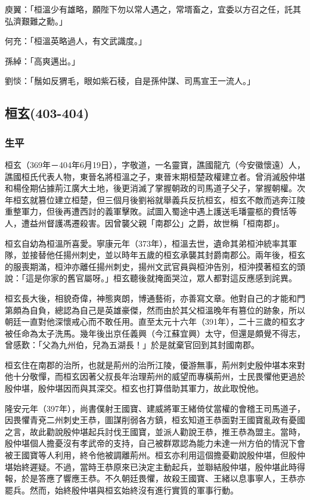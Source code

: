庾翼：「桓溫少有雄略，願陛下勿以常人遇之，常壻畜之，宜委以方召之任，託其弘濟艱難之勳。」

何充：「桓溫英略過人，有文武識度。」

孫綽：「高爽邁出。」

劉惔：「鬚如反猬毛，眼如紫石稜，自是孫仲謀、司馬宣王一流人。」

\subsection{桓玄\tiny(403-404)}

\subsubsection{生平}

桓玄（369年－404年6月19日），字敬道，一名靈寶，譙國龍亢（今安徽懷遠）人，譙國桓氏代表人物，東晉名將桓溫之子，東晉末期桓楚政權建立者。曾消滅殷仲堪和楊佺期佔據荊江廣大土地，後更消滅了掌握朝政的司馬道子父子，掌握朝權。次年桓玄就篡位建立桓楚，但三個月後劉裕就舉義兵反抗桓玄，桓玄不敵而逃奔江陵重整軍力，但後再遭西討的義軍擊敗。試圖入蜀途中遇上護送毛璠靈柩的費恬等人，遭益州督護馮遷殺害。因曾襲父親「南郡公」之爵，故世稱「桓南郡」。

桓玄自幼為桓溫所喜愛。寧康元年（373年），桓溫去世，遺命其弟桓沖統率其軍隊，並接替他任揚州刺史，並以時年五歲的桓玄承襲其封爵南郡公。兩年後，桓玄的服喪期滿，桓沖亦離任揚州刺史，揚州文武官員與桓沖告別，桓沖摸著桓玄的頭說：「這是你家的舊官屬呀。」桓玄聽後就掩面哭泣，眾人都對這反應感到詫異。

桓玄長大後，相貌奇偉，神態爽朗，博通藝術，亦善寫文章。他對自己的才能和門第頗為自負，總認為自己是英雄豪傑，然而由於其父桓溫晚年有篡位的跡象，所以朝廷一直對他深懷戒心而不敢任用。直至太元十六年（391年），二十三歲的桓玄才被任命為太子洗馬。幾年後出京任義興（今江蘇宜興）太守，但還是頗覺不得志，曾感歎：「父為九州伯，兒為五湖長！」於是就棄官回到其封國南郡。

桓玄住在南郡的治所，也就是荊州的治所江陵，優游無事，荊州刺史殷仲堪本來對他十分敬憚，而桓玄因著父叔長年治理荊州的威望而專橫荊州，士民畏懼他更過於殷仲堪，殷仲堪因而與其深交。桓玄也打算借助其軍力，故此取悅他。

隆安元年（397年），尚書僕射王國寶、建威將軍王緒倚仗當權的會稽王司馬道子，因畏懼青兗二州刺史王恭，圖謀削弱各方鎮，桓玄知道王恭面對王國寶亂政有憂國之言，故此勸說殷仲堪起兵討伐王國寶，並派人勸說王恭，推王恭為盟主。當時，殷仲堪個人擔憂沒有孝武帝的支持，自己被群眾認為能力未達一州方伯的情況下會被王國寶等人利用，終令他被調離荊州。桓玄亦利用這個擔憂勸說殷仲堪，但殷仲堪始終遲疑。不過，當時王恭原來已決定主動起兵，並聯結殷仲堪，殷仲堪此時得報，於是答應了響應王恭。不久朝廷畏懼，故殺王國寶、王緒以息事寧人，王恭亦罷兵。然而，始終殷仲堪與桓玄始終沒有進行實質的軍事行動。

